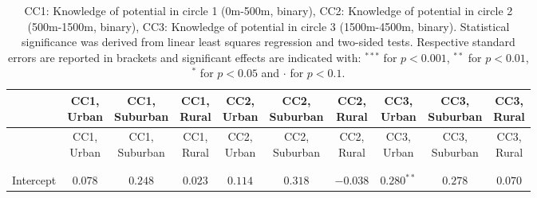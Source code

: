 
\begin{center}
\begin{small}
\begin{longtable}{l@{} c@{} c@{} c@{} c@{} c@{} c@{} c@{} c@{} c@{}}
\hline
 & \shortstack{\rule{0pt}{2.2ex}CC1,\\Urban} & \shortstack{\rule{0pt}{2.2ex}CC1,\\Suburban} & \shortstack{\rule{0pt}{2.2ex}CC1,\\Rural} & \shortstack{\rule{0pt}{2.2ex}CC2,\\Urban} & \shortstack{\rule{0pt}{2.2ex}CC2,\\Suburban} & \shortstack{\rule{0pt}{2.2ex}CC2,\\Rural} & \shortstack{\rule{0pt}{2.2ex}CC3,\\Urban} & \shortstack{\rule{0pt}{2.2ex}CC3,\\Suburban} & \shortstack{\rule{0pt}{2.2ex}CC3,\\Rural} \\
\hline
\endfirsthead
\hline
 & \shortstack{\rule{0pt}{2.2ex}CC1,\\Urban} & \shortstack{\rule{0pt}{2.2ex}CC1,\\Suburban} & \shortstack{\rule{0pt}{2.2ex}CC1,\\Rural} & \shortstack{\rule{0pt}{2.2ex}CC2,\\Urban} & \shortstack{\rule{0pt}{2.2ex}CC2,\\Suburban} & \shortstack{\rule{0pt}{2.2ex}CC2,\\Rural} & \shortstack{\rule{0pt}{2.2ex}CC3,\\Urban} & \shortstack{\rule{0pt}{2.2ex}CC3,\\Suburban} & \shortstack{\rule{0pt}{2.2ex}CC3,\\Rural} \\
\hline
\endhead
\hline
\endfoot
\hline
\multicolumn{10}{l}{\tiny{
}}\\
\caption{CC1: Knowledge of potential in circle 1 (0m-500m, binary), CC2: Knowledge of potential in circle 2 (500m-1500m, binary), CC3: Knowledge of potential in circle 3 (1500m-4500m, binary). Statistical significance was derived from linear least squares regression and two-sided tests. Respective standard errors are reported in brackets and significant effects are indicated with: $^{***}$ for $p < 0.001$, $^{**}$ for $p < 0.01$, $^*$ for $p < 0.05$ and $\cdot$ for $p < 0.1$.}
\label{table:coefficients}
\endlastfoot \\
Intercept                           & $0.078$         & $0.248$          & $0.023$     & $0.114$        & $0.318$      & $-0.038$         & $0.280^{**}$    & $0.278$         & $0.070$         \\

\end{longtable}
\end{small}
\end{center}
